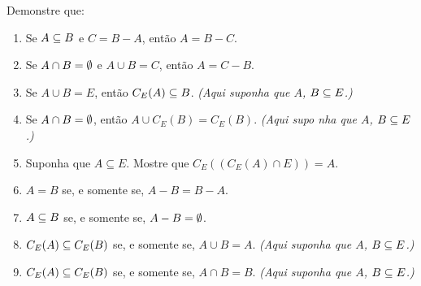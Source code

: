 \documentclass[12pt]{exam}
\begin{document}
    \questao{} Demonstre que:
    \begin{enumerate}[label={\alph*})]

        \item Se $A \subseteq B$ e $C = B - A$, ent\~ao $A = B - C$.

        \item Se $A \cap B = \emptyset$ e $A \cup B = C$, ent\~ao $A = C - B$.

        \item Se $A\cup B = E$, ent\~ao $C_E(A) \subseteq B$. \textit{(Aqui suponha que $A$,            $B \subseteq E$.)}

        \item Se $A \cap B = \emptyset$, ent\~ao $A \cup C_E(B) = C_E(B)$. \textit{(Aqui supo           nha que $A$, $B \subseteq E$.)}

        \item Suponha que $A \subseteq E$. Mostre que $C_E((C_E(A) \cap E)) = A$.

        \item $A = B$ se, e somente se, $A - B = B - A$.

        \item $A \subseteq B$ se, e somente se, $A - B = \emptyset$.

        \item $C_E(A) \subseteq C_E(B)$ se, e somente se, $A \cup B = A$. \textit{(Aqui suponha que $A$, $B \subseteq E$.)}

        \item $C_E(A) \subseteq C_E(B)$ se, e somente se, $A \cap B = B$. \textit{(Aqui suponha que $A$, $B \subseteq E$.)}

    \end{enumerate}

    \vspace{.3cm}
\end{document}
